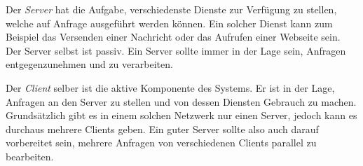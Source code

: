 \documentclass[a4paper,11pt]{report}
\begin{document}
		Der \emph{Server} hat die Aufgabe, verschiedenste Dienste zur Verfügung zu stellen, welche auf Anfrage ausgeführt werden können. Ein solcher Dienst kann zum Beispiel das Versenden einer Nachricht oder das Aufrufen einer Webseite sein. Der Server selbst ist passiv. Ein Server sollte immer in der Lage sein, Anfragen entgegenzunehmen und zu verarbeiten.
	
		Der \emph{Client} selber ist die aktive Komponente des Systems. Er ist in der Lage, Anfragen an den Server zu stellen und von dessen Diensten Gebrauch zu machen.
		Grundsätzlich gibt es in einem solchen Netzwerk nur einen Server, jedoch kann es durchaus mehrere Clients geben. Ein guter Server sollte also auch darauf vorbereitet sein, mehrere Anfragen von verschiedenen Clients parallel zu bearbeiten. \cite{fachadmin.de:ServerClient}
		
		
\end{document}
